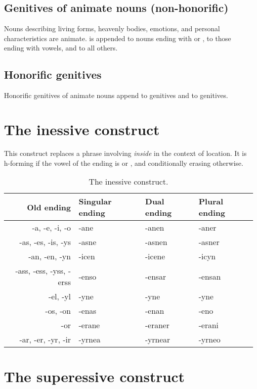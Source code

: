 \documentclass{book}
\begin{document}
\subsection{Genitives of animate nouns (non-honorific)}

Nouns describing living forms, heavenly bodies, emotions, and personal characteristics are animate.  is appended to nouns ending with  or ,  to those ending with vowels, and  to all others.

\subsection{Honorific genitives}

Honorific genitives of animate nouns append  to  genitives and  to  genitives.

\section{The inessive construct}

This construct replaces a phrase involving  \emph{inside} in the context of location. It is h-forming if the vowel of the ending is  or , and conditionally erasing otherwise.

\begin{table}[h]
  \caption{The inessive construct.}
  \centering
  \begin{tabular}{|r|l|l|l|}
    \hline
    Old ending & Singular ending & Dual ending & Plural ending \\ \hline
    -a, -e, -i, -o & -ane & -anen & -aner \\
    -as, -es, -is, -ys & -asne & -asnen & -asner \\
    -an, -en, -yn & -icen & -icene & -icyn \\
    -ass, -ess, -yss, -erss & -enso & -ensar & -ensan \\
    -el, -yl & -yne & -yne & -yne \\
    -os, -on & -enas & -enan & -eno \\
    -or & -erane & -eraner & -erani \\
    -ar, -er, -yr, -ir & -yrnea & -yrnear & -yrneo \\ \hline
  \end{tabular}
\end{table}

\section{The superessive construct}
\end{document}
